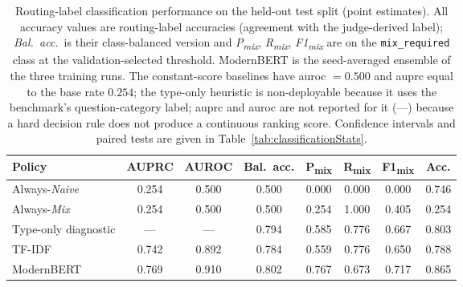 \documentclass[english, bibtex]{kththesis}               %
\numberwithin{listing}{chapter}
\begin{document}
\begin{table}[!ht]
\centering
\small
\setlength{\tabcolsep}{3.5pt}
\renewcommand{\arraystretch}{1.15}
\caption[Routing-label classification performance on the held-out test split (point estimates)]{Routing-label classification performance on the held-out test split (point estimates). All accuracy values are routing-label accuracies (agreement with the judge-derived label); \emph{Bal.\ acc.}\ is their class-balanced version and \emph{P\textsubscript{mix}}, \emph{R\textsubscript{mix}}, \emph{F1\textsubscript{mix}} are on the \texttt{mix\_required} class at the validation-selected threshold. ModernBERT is the seed-averaged ensemble of the three training runs. The constant-score baselines have \gls{auroc} $= 0.500$ and \gls{auprc} equal to the base rate $0.254$; the type-only heuristic is non-deployable because it uses the benchmark's question-category label; \gls{auprc} and \gls{auroc} are not reported for it (---) because a hard decision rule does not produce a continuous ranking score. Confidence intervals and paired tests are given in Table~\ref{tab:classificationStats}.}
\label{tab:classificationResults}
\begin{tabular}{l|ccccccc}
\textbf{Policy} & \textbf{AUPRC} & \textbf{AUROC} & \textbf{Bal.\ acc.} & \textbf{P\textsubscript{mix}} & \textbf{R\textsubscript{mix}} & \textbf{F1\textsubscript{mix}} & \textbf{Acc.} \\
\hline
Always-\emph{Naive} & 0.254 & 0.500 & 0.500 & 0.000 & 0.000 & 0.000 & 0.746 \\
Always-\emph{Mix}   & 0.254 & 0.500 & 0.500 & 0.254 & 1.000 & 0.405 & 0.254 \\
Type-only diagnostic & --- & --- & 0.794 & 0.585 & 0.776 & 0.667 & 0.803 \\
TF-IDF & 0.742 & 0.892 & 0.784 & 0.559 & 0.776 & 0.650 & 0.788 \\
ModernBERT & 0.769 & 0.910 & 0.802 & 0.767 & 0.673 & 0.717 & 0.865 \\
\end{tabular}
\end{table}
\end{document}
